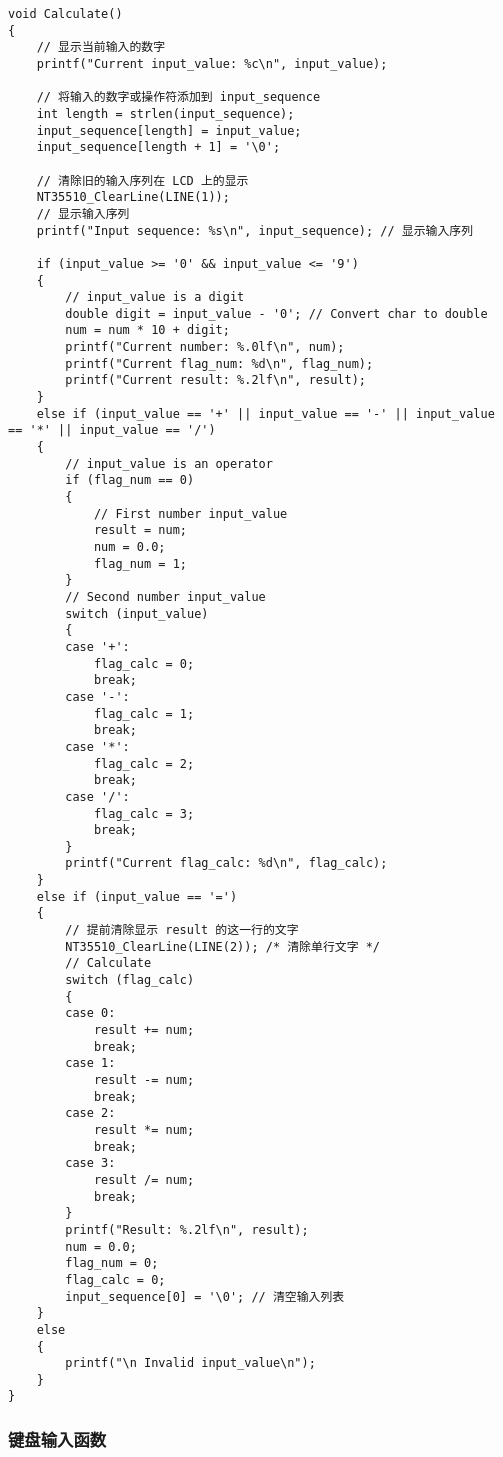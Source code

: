 \documentclass{theme-2639013-final}
\begin{document}
\begin{verbatim}
void Calculate()
{
    // 显示当前输入的数字
    printf("Current input_value: %c\n", input_value);

    // 将输入的数字或操作符添加到 input_sequence
    int length = strlen(input_sequence);
    input_sequence[length] = input_value;
    input_sequence[length + 1] = '\0';

    // 清除旧的输入序列在 LCD 上的显示
    NT35510_ClearLine(LINE(1));
    // 显示输入序列
    printf("Input sequence: %s\n", input_sequence); // 显示输入序列

    if (input_value >= '0' && input_value <= '9')
    {
        // input_value is a digit
        double digit = input_value - '0'; // Convert char to double
        num = num * 10 + digit;
        printf("Current number: %.0lf\n", num);
        printf("Current flag_num: %d\n", flag_num);
        printf("Current result: %.2lf\n", result);
    }
    else if (input_value == '+' || input_value == '-' || input_value == '*' || input_value == '/')
    {
        // input_value is an operator
        if (flag_num == 0)
        {
            // First number input_value
            result = num;
            num = 0.0;
            flag_num = 1;
        }
        // Second number input_value
        switch (input_value)
        {
        case '+':
            flag_calc = 0;
            break;
        case '-':
            flag_calc = 1;
            break;
        case '*':
            flag_calc = 2;
            break;
        case '/':
            flag_calc = 3;
            break;
        }
        printf("Current flag_calc: %d\n", flag_calc);
    }
    else if (input_value == '=')
    {
        // 提前清除显示 result 的这一行的文字
        NT35510_ClearLine(LINE(2)); /* 清除单行文字 */
        // Calculate
        switch (flag_calc)
        {
        case 0:
            result += num;
            break;
        case 1:
            result -= num;
            break;
        case 2:
            result *= num;
            break;
        case 3:
            result /= num;
            break;
        }
        printf("Result: %.2lf\n", result);
        num = 0.0;
        flag_num = 0;
        flag_calc = 0;
        input_sequence[0] = '\0'; // 清空输入列表
    }
    else
    {
        printf("\n Invalid input_value\n");
    }
}
\end{verbatim}

\subsubsection{键盘输入函数}
\end{document}
